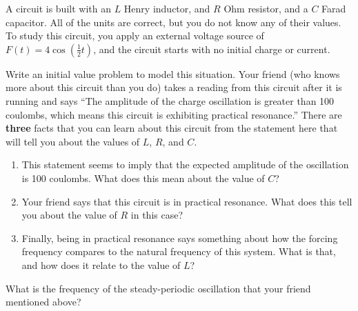 \documentclass{ximera}
\begin{document}
\begin{exercise}
    A circuit is built with an $L$ Henry inductor, and $R$ Ohm resistor, and a $C$ Farad capacitor. All of the units are correct, but you do not know any of their values. To study this circuit, you apply an external voltage source of $F(t) = 4 \cos\left(\frac{1}{2} t \right)$, and the circuit starts with no initial charge or current.
    \begin{tasks}
        \task Write an initial value problem to model this situation.
        \task Your friend (who knows more about this circuit than you do) takes a reading from this circuit after it is running and says ``The amplitude of the charge oscillation is greater than 100 coulombs, which means this circuit is exhibiting practical resonance.'' There are \textbf{three} facts that you can learn about this circuit from the statement here that will tell you about the values of $L$, $R$, and $C$. 
        \begin{enumerate}
            \item This statement seems to imply that the expected amplitude of the oscillation is 100 coulombs. What does this mean about the value of $C$?
            \item Your friend says that this circuit is in practical resonance. What does this tell you about the value of $R$ in this case?
            \item Finally, being in practical resonance says something about how the forcing frequency compares to the natural frequency of this system. What is that, and how does it relate to the value of $L$?
        \end{enumerate}
        \task What is the frequency of the steady-periodic oscillation that your friend mentioned above? 
    \end{tasks}
\end{exercise}


\end{document}
